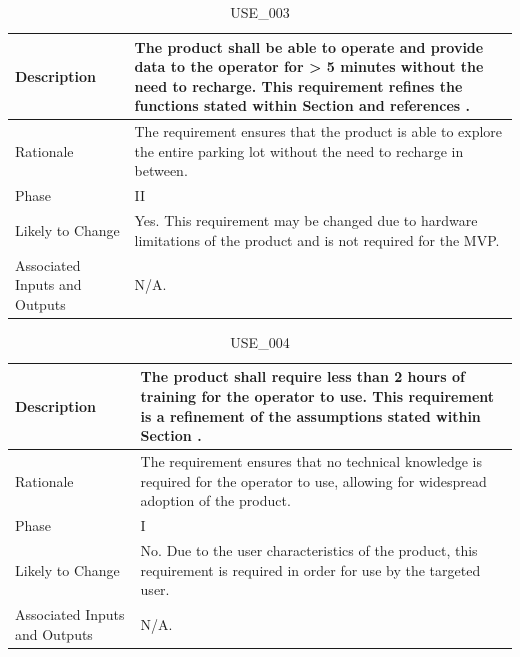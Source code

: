 \documentclass{article}
\begin{document}
\begin{table}[!h]
\begin{center}
\caption {USE\_003} 
\label{USE_003}
\begin{tabular}{ | m{3cm} | m{11cm} | }
\hline
Description & The product shall be able to operate and provide data to the operator for > 5 minutes without the need to recharge. This requirement refines the functions stated within Section \nameref{subsec:ProdFunc} and references \nameref{MTNC_001}. \\
\hline
Rationale & The requirement ensures that the product is able to explore the entire parking lot without the need to recharge in between. \\
\hline
Phase & II \\
\hline
Likely to Change & Yes. This requirement may be changed due to hardware limitations of the product and is not required for the MVP. \\
\hline
Associated Inputs and Outputs & N/A.  \\
\hline
\end{tabular}
\end{center}
\end{table}

\begin{table}[!h]
\begin{center}
\caption {USE\_004} 
\label{USE_004}
\begin{tabular}{ | m{3cm} | m{11cm} | }
\hline
Description & The product shall require less than 2 hours of training for the operator to use. This requirement is a refinement of the assumptions stated within Section \nameref{sec:Assumptions}. \\
\hline
Rationale & The requirement ensures that no technical knowledge is required for the operator to use, allowing for widespread adoption of the product. \\
\hline
Phase & I \\
\hline
Likely to Change & No. Due to the user characteristics of the product, this requirement is required in order for use by the targeted user. \\
\hline
Associated Inputs and Outputs & N/A.  \\
\hline
\end{tabular}
\end{center}
\end{table}
\end{document}

